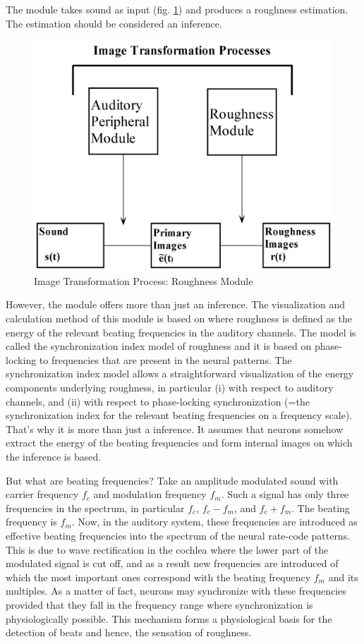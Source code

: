 The module takes sound as input (fig. \ref{Fig:RMModule}) and
produces a roughness estimation. The estimation should be
considered an inference.
\begin{figure}[h]
    \centering
    \includegraphics[width=\IPEMDefaultFigureWidth]{Graphics/RMModule}
    \caption{Image Transformation Process: Roughness Module}
    \label{Fig:RMModule}
\end{figure}
However, the module offers more than just an inference. The
visualization and calculation method of this module is based on
 where roughness is
defined as the energy of the relevant beating frequencies in the
auditory channels. The model is called the synchronization index
model of roughness and it is based on phase-locking to frequencies
that are present in the neural patterns. The synchronization index
model allows a straightforward visualization of the energy
components underlying roughness, in particular (i) with respect to
auditory channels, and (ii) with respect to phase-locking
synchronization (=the synchronization index for the relevant
beating frequencies on a frequency scale). That's why it is more
than just a inference. It assumes that neurons somehow extract the
energy of the beating frequencies and form internal images on
which the inference is based.

But what are beating frequencies? Take an amplitude modulated
sound with carrier frequency $f_c$ and modulation frequency
$f_m$. Such a signal has only three frequencies in the spectrum,
in particular $f_c$, $f_c-f_m$, and $f_c+f_m$. The beating
frequency is $f_m$. Now, in the auditory system, these frequencies
are introduced as effective beating frequencies into the spectrum
of the neural rate-code patterns. This is due to wave
rectification in the cochlea where the lower part of the modulated
signal is cut off, and as a result new frequencies are introduced
of which the most important ones correspond with the beating
frequency $f_m$ and its multiples. As a matter of fact, neurons
may synchronize with these frequencies provided that they fall in
the frequency range where synchronization is physiologically
possible. This mechanism forms a physiological basis for the
detection of beats and hence, the sensation of roughness.

